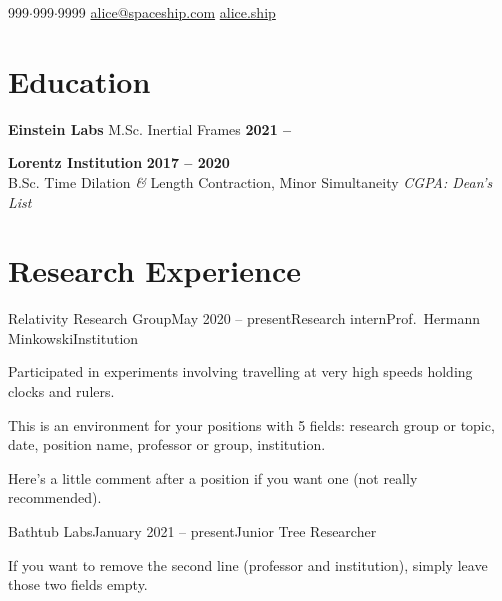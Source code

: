 \documentclass{resume}
\begin{document}
\begin{center}
    \contact
        {999$\cdot$999$\cdot$9999}
        {\href{mailto://alice@spaceship.com}{alice@spaceship.com}}
        {\href{https://alice.ship}{alice.ship}}
\end{center}

\section{Education} 
\begin{content}
    {\bf Einstein Labs} {M.Sc. Inertial Frames} \hfill {\bf 2021 --} 

    {\bf Lorentz Institution} \hfill {\bf 2017 -- 2020} \\ 
    {B.Sc. Time Dilation {\em\&} Length Contraction, Minor Simultaneity} \hfill 
    {\em CGPA:  \quad Dean's List}
    
\sectionlineskip
\end{content}

\section{Research Experience}
\begin{content}

    \begin{position}{Relativity Research Group}{May 2020 -- present}{Research intern}{Prof.~Hermann Minkowski}{Institution}
    \item Participated in experiments involving travelling at very high speeds holding clocks and rulers.
    \item This is an environment for your positions with 5 fields: research group or topic, date, position name, professor or group, institution. 
    \end{position}
    \vspace{-.5\baselineskip}
    Here's a little comment after a position if you want one (not really recommended).

    \begin{position}{Bathtub Labs}{January 2021 -- present}{Junior Tree Researcher}{}{}
    \item If you want to remove the second line (professor and institution), simply leave those two fields empty. 
    \end{position}

\sectionlineskip
\end{content}
\vspace{-3\medskipamount}
\end{document}
